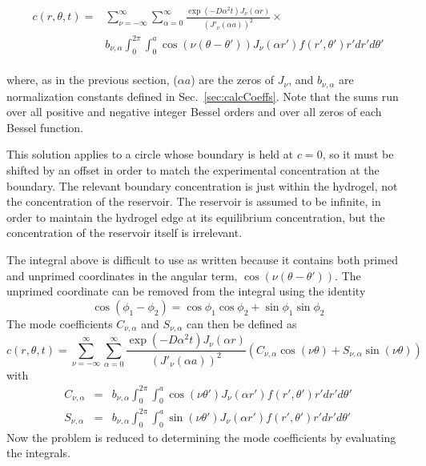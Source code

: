 \begin{equation}
\begin{split}
c(r,\theta,t) =& \sum_{\nu=-\infty}^{\infty} \sum_{\alpha = 0}^\infty   \frac{\exp\left(-D\alpha^2t\right)J_\nu\left(\alpha r\right)}{\left(J'_\nu(\alpha a)\right)^2} \times \\ 
&b_{\nu,\alpha} \int_0^{2\pi} \int_0^a \cos\left(\nu(\theta-\theta')\right) J_\nu(\alpha r') f(r',\theta') r' dr' d\theta' \label{eq:full-series}
\end{split}
\end{equation}
\\
where, as in the previous section, ($\alpha a$) are the zeros of $J_\nu$, and $b_{\nu,\alpha}$ are normalization constants defined in Sec.~\ref{sec:calcCoeffs}.  Note that the sums run over all positive and negative integer Bessel orders and over all zeros of each Bessel function.  

This solution applies to a circle whose boundary is held at $c=0$, so it must be shifted by an offset in order to match the experimental concentration at the boundary.  The relevant boundary concentration is just within the hydrogel, not the concentration of the reservoir.  The reservoir is assumed to be infinite, in order to maintain the hydrogel edge at its equilibrium concentration, but the concentration of the reservoir itself is irrelevant.

The integral above is difficult to use as written because it contains both primed and unprimed coordinates in the angular term, $\cos\left(\nu(\theta -\theta')\right)$.  The unprimed coordinate can be removed from the integral using the identity $$\cos(\phi_1-\phi_2) = \cos\phi_1\cos\phi_2 + \sin\phi_1\sin\phi_2$$ The mode coefficients $C_{\nu,\alpha}$ and $S_{\nu,\alpha}$ can then be defined as
\begin{equation}
c(r,\theta,t) = \sum_{\nu=-\infty}^{\infty} \sum_{\alpha = 0}^\infty   \frac{\exp\left(-D\alpha^2t\right)J_\nu\left(\alpha r\right)}{\left(J'_\nu (\alpha a)\right)^2} \left(C_{\nu,\alpha}\cos(\nu\theta) + S_{\nu,\alpha} \sin(\nu\theta)\right)
\label{eq:c-s-series}
\end{equation}
with 
\begin{eqnarray}
C_{\nu,\alpha} & = &b_{\nu,\alpha} \int_0^{2\pi} \int_0^a \cos\left(\nu\theta'\right) J_\nu(\alpha r')f(r',\theta') r' dr' d\theta' \label{eq:cos-defn}\\
S_{\nu,\alpha} & = & b_{\nu,\alpha}\int_0^{2\pi} \int_0^a \sin\left(\nu\theta'\right) J_\nu(\alpha r') f(r',\theta') r' dr' d\theta' \label{eq:sin-defn}
\end{eqnarray}
Now the problem is reduced to determining the mode coefficients by evaluating the integrals.

